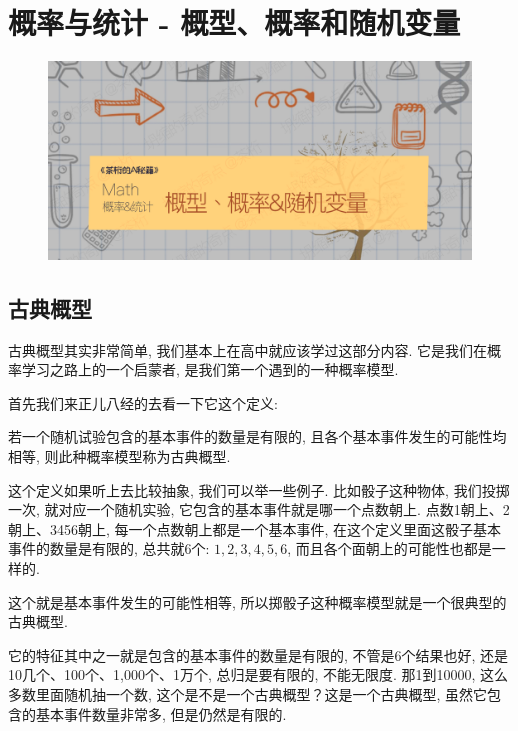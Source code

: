 \chapter{概率与统计 - 概型、概率和随机变量}

\begin{figure}[ht]
  \centering
  \includegraphics[width=1\linewidth]{asset/20230917164229.png}
\end{figure}

\newpage

\section{古典概型}

古典概型其实非常简单, 我们基本上在高中就应该学过这部分内容. 它是我们在概率学习之路上的一个启蒙者, 是我们第一个遇到的一种概率模型. 

首先我们来正儿八经的去看一下它这个定义: 

\begin{newquotation}
若一个随机试验包含的基本事件的数量是有限的, 且各个基本事件发生的可能性均相等, 则此种概率模型称为古典概型. 
\end{newquotation}

这个定义如果听上去比较抽象, 我们可以举一些例子. 比如骰子这种物体, 我们投掷一次, 就对应一个随机实验, 它包含的基本事件就是哪一个点数朝上. 点数1朝上、2朝上、3456朝上, 每一个点数朝上都是一个基本事件, 在这个定义里面这骰子基本事件的数量是有限的, 总共就6个: $1, 2, 3, 4, 5, 6$, 而且各个面朝上的可能性也都是一样的. 

这个就是基本事件发生的可能性相等, 所以掷骰子这种概率模型就是一个很典型的古典概型. 

它的特征其中之一就是包含的基本事件的数量是有限的, 不管是6个结果也好, 还是10几个、100个、1,000个、1万个, 总归是要有限的, 不能无限度. 那1到10000, 这么多数里面随机抽一个数, 这个是不是一个古典概型？这是一个古典概型, 虽然它包含的基本事件数量非常多, 但是仍然是有限的. 


